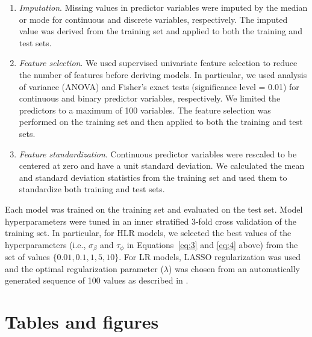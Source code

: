 \begin{enumerate}
    \item \textit{Imputation}. Missing values in predictor variables were imputed by the median or mode for continuous and discrete variables, respectively. The imputed value was derived from the training set and applied to both the training and test sets.
    
    \item \textit{Feature selection}. We used supervised univariate feature selection to reduce the number of features before deriving models. In particular, we used analysis of variance (ANOVA) and Fisher’s exact tests (significance level = 0.01) for continuous and binary predictor variables, respectively. We limited the predictors to a maximum of 100 variables. The feature selection was performed on the training set and then applied to both the training and test sets.
    
    \item \textit{Feature standardization}. Continuous predictor variables were rescaled to be centered at zero and have a unit standard deviation. We calculated the mean and standard deviation statistics from the training set and used them to standardize both training and test sets.
\end{enumerate}

Each model was trained on the training set and evaluated on the test set. Model hyperparameters were tuned in an inner stratified 3-fold cross validation of the training set. In particular, for HLR models, we selected the best values of the hyperparameters (i.e., $\sigma_{\beta}$ and $\tau_{\phi}$ in Equations~\ref{eq:3} and \ref{eq:4} above) from the set of values $\{0.01, 0.1, 1, 5, 10\}$. For LR models, LASSO regularization was used and the optimal regularization parameter ($\lambda$) was chosen from an automatically generated sequence of 100 values as described in \cite{Friedman2010}.

\section{Tables and figures}\label{sec:app_C}



